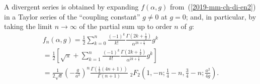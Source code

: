 A divergent series is obtained by expanding $f\left(\alpha,g\right)$ from~(\ref{2019-mm-ch-di-en2})
in a Taylor series of the ``coupling constant'' $g\neq 0$
at $g=0$; and, in particular, by taking the limit $n\rightarrow \infty$ of the partial sum up to order $n$ of $g$:
\begin{equation}
\begin{split}
f_{n}\left(\alpha,g\right)
=
\frac{1}{2}\sum_{k=0}^{n}\frac{\left(-1\right)^{k}}{k!}\frac{\varGamma\left(2k+\frac{1}{2}\right)}{\alpha^{2k+\frac{1}{2}}}g^{k}
\qquad \qquad
\\=
\frac{1}{2}\left[
\sqrt{\pi}
+
\sum_{k=1}^{n}\frac{\left(-1\right)^{k}}{k!}\frac{\varGamma\left(2k+\frac{1}{2}\right)}{\alpha^{2k+\frac{1}{2}}}g^{k}
\right]
\\
=
\frac{1}{2 \sqrt{a}} \left(-\frac{g}{a^2}\right)^n \frac{\Gamma \left(\frac{1}{2} (4 n+1)\right)}{ \Gamma (n+1)}
{\;}_2F_2\left(1,-n;\frac{1}{4}-n,\frac{3}{4}-n;\frac{a^2}{4 g}\right)
.
\label{2019-mm-ch-di-en3}
\end{split}
\end{equation}




